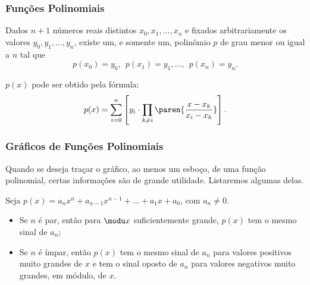 \documentclass[10pt]{beamer}
\begin{document}

\begin{frame}
\frametitle{Funções Polinomiais} 
\begin{proposicao}
Dados $n+1$ números reais distintos $x_0, x_1 , \dots , x_n$ e
fixados arbitrariamente os valores $y_0, y_1, \dots, y_n$, existe
um, e somente um, polinômio $p$ de grau menor ou igual a $n$ tal que
$$p(x_0) = y_0, \ \ p(x_1) = y_1,  \dots , \ \ p(x_n) = y_n.$$

$p(x)$ pode ser obtido pela fórmula:
$$p(x) = \sum_{i=0}^{n} \colc{y_i \cdot \prod_{k \neq i} \paren{\frac {x-
x_k}{x_i-x_k}}}.$$
\end{proposicao}

\end{frame}


\begin{frame}
\frametitle{Gráficos de Funções Polinomiais} 
Quando se deseja traçar o gráfico, ao menos um esboço, de uma função
polinomial, certas informações são de grande utilidade. Listaremos
algumas delas.

Seja $p(x) = a_n x^n+ a_{n-1} x^{n-1} + \dots + a_1x + a_0$, com
$a_n \neq 0$.
\begin{itemize}
	\item Se $n$ é par, então para $\modu x $ suficientemente grande,
	$p(x)$ tem o mesmo sinal de $a_n$;
	\item Se $n$ é ímpar, então $p(x)$ tem o mesmo sinal de $a_n$ para
	valores positivos  muito grandes de $x$ e tem o sinal oposto de
	$a_n$ para valores negativos muito grandes, em módulo, de $x$.
\end{itemize}

\end{frame}
\end{document}
